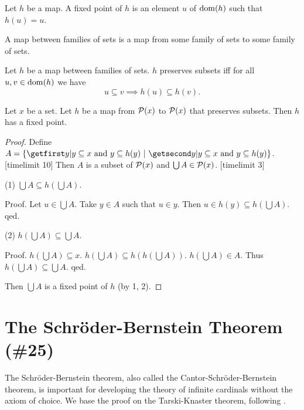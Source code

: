 \documentclass{article}
\begin{document}
 \begin{forthel}
    \begin{definition}
      Let $h$ be a map.
      A fixed point of $h$ is an element $u$ of $\operatorname{dom}(h)$ such that $h(u) = u$.
    \end{definition}

    \begin{definition}
      A map between families of sets is a map from some family of 
sets to some
      family of sets.
    \end{definition}

    \begin{definition*}
Let $h$ be a map between families of sets.
      $h$ preserves subsets iff for all $u, v \in \operatorname{dom}(h)$
      we have \[ u \subseteq v \implies h(u) \subseteq h(v). \]
    \end{definition*}


    \begin{theorem*}\label{KT}
      Let $x$ be a set.
      Let $h$ be a map from ${\cal P}(x)$ to ${\cal P}(x)$ that preserves subsets.
      Then $h$ has a fixed point.
    \end{theorem*}
    \begin{proof}
      Define $A = \class{y | \text{$y \subseteq x$ and
      $y \subseteq h(y)$}}$.
[timelimit 10]
      Then $A$ is a subset of ${\cal P}(x)$ and
      $\bigcup A \in {\cal P}(x)$.
[timelimit 3] 

(1) $\bigcup A \subseteq h(\bigcup A)$.

Proof.        Let $u \in \bigcup A$.
        Take $y \in A$ such that $u \in y$.
        Then $u \in h(y) \subseteq h(\bigcup A)$.
      qed.

(2) $h(\bigcup A) \subseteq \bigcup A$.

Proof.      $h(\bigcup A) \subseteq x$.
$h(\bigcup A) \subseteq h(h(\bigcup A))$.
$h(\bigcup A) \in A$.
Thus $h(\bigcup A) \subseteq \bigcup A$.
qed.

Then $\bigcup A$ is a fixed point of $h$ (by 1, 2).
    \end{proof}

\end{forthel}

\section{The Schröder-Bernstein Theorem (\#25)}

The Schröder-Bernstein theorem, also called the
Cantor-Schröder-Bernstein theorem, is important for developing
the theory of infinite cardinals without the axiom of choice.
We base the proof on the Tarski-Knaster theorem, following
 \cite[p. 530]{Schroeder2012}.
\end{document}
